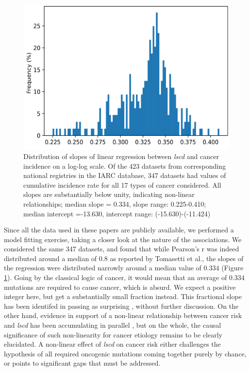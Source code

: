 \documentclass[12pt,onecolumn,twoside]{article}
\begin{document}
		\begin{figure}[tbhp]
			\begin{minipage}[c]{0.59\textwidth}
				\includegraphics[width=\linewidth, keepaspectratio=true]{lin_slopes.png}
			\end{minipage}\hfill
			\begin{minipage}[c]{.4\textwidth}
				\caption[Distribution of slopes]{Distribution of slopes of linear regression between \textit{lscd} and cancer incidence on a log-log scale. Of the 423 datasets from corresponding national registries in the IARC database, 347 datasets had values of cumulative incidence rate for all 17 types of cancer considered. All slopes are substantially below unity, indicating non-linear relationships; median slope = 0.334, slope range: 0.225-0.410; median intercept =-13.630, intercept range: (-15.630)-(-11.424)}
				\label{slopes}
			\end{minipage}
		\end{figure}

		Since all the data used in these papers are publicly available, we performed a model fitting exercise, taking a closer look at the nature of the associations. We considered the same 347 datasets, and found that while Pearson's r was indeed distributed around a median of $0.8$ as reported by Tomasetti et al., the slopes of the regression were distributed narrowly around a median value of $0.334$ (Figure \ref{slopes}). Going by the classical logic of cancer, it would mean that an average of $0.334$ mutations are required to cause cancer, which is absurd. We expect a positive integer here, but get a substantially small fraction instead. This fractional slope has been identifed in passing as surprising \autocite{Nowak1266}, without further discussion. On the other hand, evidence in support of a non-linear relationship between cancer risk and \textit{lscd} has been accumulating in parallel \autocite{Noble2015}, but on the whole, the causal significance of such non-linearity for cancer etiology remains to be clearly elucidated. A non-linear effect of \textit{lscd} on cancer risk either challenges the hypothesis of all required oncogenic mutations coming together purely by chance, or points to significant gaps that must be addressed.
	
\end{document}
